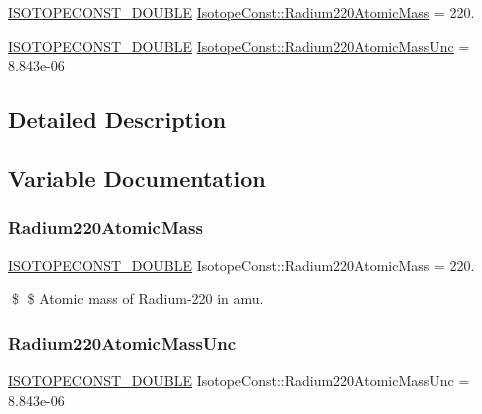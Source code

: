\begin{DoxyCompactItemize}
\item 
\mbox{\hyperlink{group___isotope_const-_macros_ga8f45a7272ce02c0b4c65c44636ed719a}{I\+S\+O\+T\+O\+P\+E\+C\+O\+N\+S\+T\+\_\+\+D\+O\+U\+B\+LE}} \mbox{\hyperlink{group___isotope_const-_radium-_ra220_gab70ebf74112d4d9553ea30f323bedaec}{Isotope\+Const\+::\+Radium220\+Atomic\+Mass}} = 220.
\item 
\mbox{\hyperlink{group___isotope_const-_macros_ga8f45a7272ce02c0b4c65c44636ed719a}{I\+S\+O\+T\+O\+P\+E\+C\+O\+N\+S\+T\+\_\+\+D\+O\+U\+B\+LE}} \mbox{\hyperlink{group___isotope_const-_radium-_ra220_ga31006d8f9f99bf795f4b86a8c7627ec1}{Isotope\+Const\+::\+Radium220\+Atomic\+Mass\+Unc}} = 8.\+843e-\/06
\end{DoxyCompactItemize}


\subsection{Detailed Description}


\subsection{Variable Documentation}
\mbox{\label{group___isotope_const-_radium-_ra220_gab70ebf74112d4d9553ea30f323bedaec}} 
\subsubsection{\texorpdfstring{Radium220\+Atomic\+Mass}{Radium220AtomicMass}}
{\footnotesize\ttfamily \mbox{\hyperlink{group___isotope_const-_macros_ga8f45a7272ce02c0b4c65c44636ed719a}{I\+S\+O\+T\+O\+P\+E\+C\+O\+N\+S\+T\+\_\+\+D\+O\+U\+B\+LE}} Isotope\+Const\+::\+Radium220\+Atomic\+Mass = 220.}

\$ \$ Atomic mass of Radium-\/220 in amu. \mbox{\label{group___isotope_const-_radium-_ra220_ga31006d8f9f99bf795f4b86a8c7627ec1}} 
\subsubsection{\texorpdfstring{Radium220\+Atomic\+Mass\+Unc}{Radium220AtomicMassUnc}}
{\footnotesize\ttfamily \mbox{\hyperlink{group___isotope_const-_macros_ga8f45a7272ce02c0b4c65c44636ed719a}{I\+S\+O\+T\+O\+P\+E\+C\+O\+N\+S\+T\+\_\+\+D\+O\+U\+B\+LE}} Isotope\+Const\+::\+Radium220\+Atomic\+Mass\+Unc = 8.\+843e-\/06}

